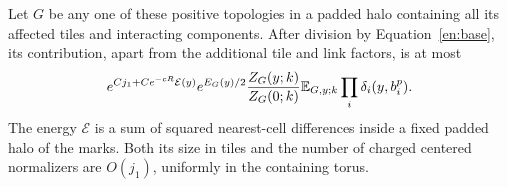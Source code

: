 \begin{lemma}\label{en:normalization}
Let $G$ be any one of these positive topologies in a padded halo
containing all its affected tiles and interacting components.
After division by Equation~\eqref{en:base}, its contribution, apart
from the additional tile and link factors, is at most
\begin{equation}\label{en:normalization-bound}
 e^{Cj_1+Ce^{-cR}\mathcal E(y)}
 e^{E_G(y)/2}\frac{Z_G(y;k)}{Z_G(0;k)}
                \mathbb E_{G,y;k}\prod_i\delta_i(y,b_i^p).
\end{equation}
The energy $\mathcal E$ is a sum of squared nearest-cell differences
inside a fixed padded halo of the marks.  Both its size in tiles and
the number of charged centered normalizers are $O(j_1)$, uniformly in
the containing torus.
\end{lemma}

